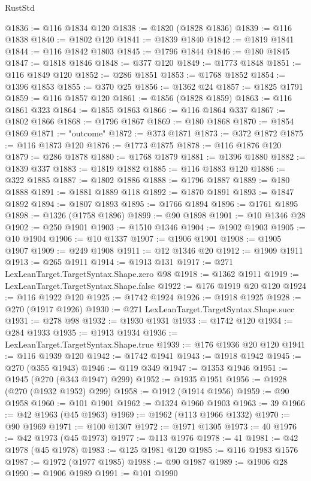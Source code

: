 \begin{lexlean}{RustStd}
\begin{coremodule}
@1836 := @116 @1834 @120
@1838 := @1820 (@1828 @1836)
@1839 := @116 @1838
@1840 := @1802 @120
@1841 := @1839 @1840
@1842 := @1819 @1841
@1844 := @116 @1842 @1803
@1845 := @1796 @1844
@1846 := @180 @1845
@1847 := @1818 @1846
@1848 := @377 @120
@1849 := @1773 @1848
@1851 := @116 @1849 @120
@1852 := @286 @1851
@1853 := @1768 @1852
@1854 := @1396 @1853
@1855 := @370 @25
@1856 := @1362 @24
@1857 := @1825 @1791
@1859 := @116 @1857 @120
@1861 := @1856 (@1828 @1859)
@1863 := @116 @1861 @323
@1864 := @1855 @1863
@1866 := @116 @1864 @337
@1867 := @1802 @1866
@1868 := @1796 @1867
@1869 := @180 @1868
@1870 := @1854 @1869
@1871 := "outcome"
@1872 := @373 @1871
@1873 := @372 @1872
@1875 := @116 @1873 @120
@1876 := @1773 @1875
@1878 := @116 @1876 @120
@1879 := @286 @1878
@1880 := @1768 @1879
@1881 := @1396 @1880
@1882 := @1839 @337
@1883 := @1819 @1882
@1885 := @116 @1883 @120
@1886 := @322 @1885
@1887 := @1802 @1886
@1888 := @1796 @1887
@1889 := @180 @1888
@1891 := @1881 @1889 @118
@1892 := @1870 @1891
@1893 := @1847 @1892
@1894 := @1807 @1893
@1895 := @1766 @1894
@1896 := @1761 @1895
@1898 := @1326 (@1758 @1896)
@1899 := @90 @1898
@1901 := @10 @1346 @28
@1902 := @250 @1901
@1903 := @1510 @1346
@1904 := @1902 @1903
@1905 := @10 @1904
@1906 := @10 @1337
@1907 := @1906 @1901
@1908 := @1905 @1907
@1909 := @249 @1908
@1911 := @12 @1346 @20
@1912 := @1909 @1911
@1913 := @265 @1911
@1914 := @1913 @131
@1917 := @271 LexLeanTarget.TargetSyntax.Shape.zero @98
@1918 := @1362 @1911
@1919 := LexLeanTarget.TargetSyntax.Shape.false
@1922 := @176 @1919 @20 @120
@1924 := @116 @1922 @120
@1925 := @1742 @1924
@1926 := @1918 @1925
@1928 := @270 (@1917 @1926)
@1930 := @271 LexLeanTarget.TargetSyntax.Shape.succ
@1931 := @278 @98
@1932 := @1930 @1931
@1933 := @1742 @120
@1934 := @284 @1933
@1935 := @1913 @1934
@1936 := LexLeanTarget.TargetSyntax.Shape.true
@1939 := @176 @1936 @20 @120
@1941 := @116 @1939 @120
@1942 := @1742 @1941
@1943 := @1918 @1942
@1945 := @270 (@355 @1943)
@1946 := @119 @349
@1947 := @1353 @1946
@1951 := @1945 (@270 (@343 @1947) @299)
@1952 := @1935 @1951
@1956 := @1928 (@270 (@1932 @1952) @299)
@1958 := @1912 (@1914 @1956)
@1959 := @90 @1958
@1960 := @101 @1901
@1962 := @1324 @1960 @1903
@1963 := 39
@1966 := @42 @1963 (@45 @1963)
@1969 := @1962 (@113 @1966 @1332)
@1970 := @90 @1969
@1971 := @100 @1307
@1972 := @1971 @1305
@1973 := 40
@1976 := @42 @1973 (@45 @1973)
@1977 := @113 @1976
@1978 := 41
@1981 := @42 @1978 (@45 @1978)
@1983 := @125 @1981 @120
@1985 := @116 @1983 @1576
@1987 := @1972 (@1977 @1985)
@1988 := @90 @1987
@1989 := @1906 @28
@1990 := @1906 @1989
@1991 := @101 @1990

\end{coremodule}
\end{lexlean}
